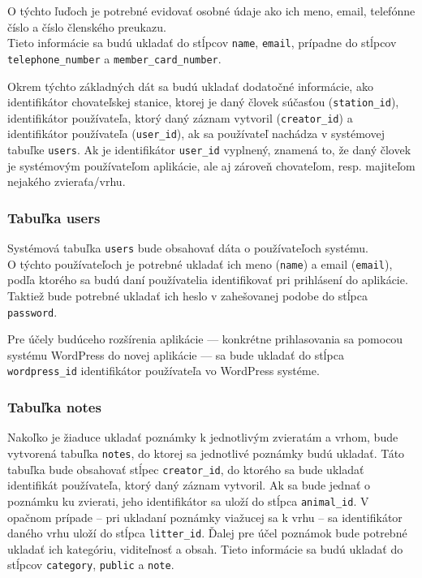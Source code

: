 O týchto ľuďoch je potrebné evidovať osobné údaje ako ich meno, email, telefónne číslo a číslo členského preukazu.
\\ Tieto informácie sa budú ukladať do stĺpcov \texttt{name}, \texttt{email}, prípadne do stĺpcov \texttt{telephone_number} a \texttt{member_card_number}.

Okrem týchto základných dát sa budú ukladať dodatočné informácie, ako identifikátor chovateľskej stanice, ktorej je daný človek súčasťou (\texttt{station_id}), identifikátor používateľa, ktorý daný záznam vytvoril (\texttt{creator_id}) a identifikátor používateľa (\texttt{user_id}), ak sa používateľ nachádza v systémovej tabuľke \texttt{users}. Ak je identifikátor \texttt{user_id} vyplnený, znamená to, že daný človek je systémovým používateľom aplikácie, ale aj zároveň chovateľom, resp. majiteľom nejakého zvieraťa/vrhu.

\subsubsection{Tabuľka users}
Systémová tabuľka \texttt{users} bude obsahovať dáta o používateľoch systému.\\ O týchto používateľoch je potrebné ukladať ich meno (\texttt{name}) a email (\texttt{email}), podľa ktorého sa budú daní používatelia identifikovať pri prihlásení do aplikácie. Taktiež bude potrebné ukladať ich heslo v zahešovanej podobe do stĺpca \texttt{password}.

Pre účely budúceho rozšírenia aplikácie --- konkrétne prihlasovania sa pomocou systému WordPress do novej aplikácie --- sa bude ukladať do stĺpca \texttt{wordpress_id} identifikátor používateľa vo WordPress systéme.

\subsubsection{Tabuľka notes}
Nakoľko je žiaduce ukladať poznámky k jednotlivým zvieratám a vrhom, bude vytvorená tabuľka \texttt{notes}, do ktorej sa jednotlivé poznámky budú ukladať.
Táto tabuľka bude obsahovať stĺpec \texttt{creator_id}, do ktorého sa bude ukladať identifikát používateľa, ktorý daný záznam vytvoril. Ak sa bude jednať o poznámku ku zvierati, jeho identifikátor sa uloží do stĺpca \texttt{animal_id}. V opačnom prípade -- pri ukladaní poznámky viažucej sa k vrhu -- sa identifikátor daného vrhu uloží do stĺpca \texttt{litter_id}.
Ďalej pre účel poznámok bude potrebné ukladať ich kategóriu, viditeľnosť a obsah. Tieto informácie sa budú ukladať do stĺpcov \texttt{category}, \texttt{public} a \texttt{note}.

